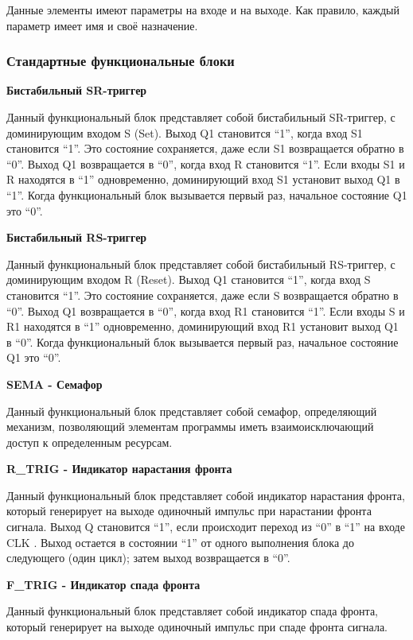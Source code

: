 \documentclass[letterpaper,10pt,russian]{sphinxmanual}
\begin{document}
Данные элементы имеют параметры на входе и на выходе. Как правило,
каждый параметр имеет имя и своё назначение.


\subsubsection{Стандартные функциональные блоки}
\label{usage_guide/library:id2}
\textbf{Бистабильный SR-триггер}

Данный функциональный блок представляет собой бистабильный SR-триггер, с
доминирующим входом S (Set). Выход Q1 становится ``1'', когда вход S1
становится ``1''. Это состояние сохраняется, даже если S1 возвращается
обратно в ``0''. Выход Q1 возвращается в ``0'', когда вход R становится ``1''.
Если входы S1 и R находятся в ``1'' одновременно, доминирующий вход S1
установит выход Q1 в ``1''. Когда функциональный блок вызывается первый
раз, начальное состояние Q1 это ``0''.

\textbf{Бистабильный RS-триггер}

Данный функциональный блок представляет собой бистабильный RS-триггер, с
доминирующим входом R (Reset). Выход Q1 становится ``1'', когда вход S
становится ``1''. Это состояние сохраняется, даже если S возвращается
обратно в ``0''. Выход Q1 возвращается в ``0'', когда вход R1 становится
``1''. Если входы S и R1 находятся в ``1'' одновременно, доминирующий вход
R1 установит выход Q1 в ``0''. Когда функциональный блок вызывается первый
раз, начальное состояние Q1 это ``0''.

\textbf{SEMA - Семафор}

Данный функциональный блок представляет собой семафор, определяющий
механизм, позволяющий элементам программы иметь взаимоисключающий доступ
к определенным ресурсам.

\textbf{R\_TRIG - Индикатор нарастания фронта}

Данный функциональный блок представляет собой индикатор нарастания
фронта, который генерирует на выходе одиночный импульс при нарастании
фронта сигнала. Выход Q становится ``1'', если происходит переход из ``0'' в
``1'' на входе CLK . Выход остается в состоянии ``1'' от одного выполнения
блока до следующего (один цикл); затем выход возвращается в ``0''.

\textbf{F\_TRIG - Индикатор спада фронта}

Данный функциональный блок представляет собой индикатор спада фронта,
который генерирует на выходе одиночный импульс при спаде фронта сигнала.
\end{document}
